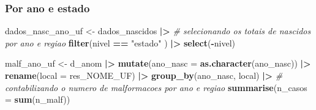 \documentclass[
]{article}
\newenvironment{Shaded}{\begin{snugshade}}{\end{snugshade}}
\newcommand{\AttributeTok}[1]{\textcolor[rgb]{0.13,0.29,0.53}{#1}}
\newcommand{\CommentTok}[1]{\textcolor[rgb]{0.56,0.35,0.01}{\textit{#1}}}
\newcommand{\FunctionTok}[1]{\textcolor[rgb]{0.13,0.29,0.53}{\textbf{#1}}}
\newcommand{\NormalTok}[1]{#1}
\newcommand{\OtherTok}[1]{\textcolor[rgb]{0.56,0.35,0.01}{#1}}
\newcommand{\SpecialCharTok}[1]{\textcolor[rgb]{0.81,0.36,0.00}{\textbf{#1}}}
\newcommand{\StringTok}[1]{\textcolor[rgb]{0.31,0.60,0.02}{#1}}
\begin{document}
\hypertarget{por-ano-e-estado}{%
\subsubsection{Por ano e estado}\label{por-ano-e-estado}}

\begin{Shaded}
\begin{Highlighting}[]
\NormalTok{dados\_nasc\_ano\_uf }\OtherTok{\textless{}{-}}\NormalTok{ dados\_nascidos }\SpecialCharTok{|\textgreater{}} 
  \CommentTok{\# selecionando os totais de nascidos por ano e regiao}
  \FunctionTok{filter}\NormalTok{(nivel }\SpecialCharTok{==} \StringTok{"estado"}\NormalTok{ ) }\SpecialCharTok{|\textgreater{}} 
  \FunctionTok{select}\NormalTok{(}\SpecialCharTok{{-}}\NormalTok{nivel)}

\NormalTok{malf\_ano\_uf }\OtherTok{\textless{}{-}}\NormalTok{ d\_anom }\SpecialCharTok{|\textgreater{}} 
  \FunctionTok{mutate}\NormalTok{(}\AttributeTok{ano\_nasc =} \FunctionTok{as.character}\NormalTok{(ano\_nasc)) }\SpecialCharTok{|\textgreater{}} 
  \FunctionTok{rename}\NormalTok{(}\AttributeTok{local =}\NormalTok{ res\_NOME\_UF) }\SpecialCharTok{|\textgreater{}} 
  \FunctionTok{group\_by}\NormalTok{(ano\_nasc, local) }\SpecialCharTok{|\textgreater{}} 
  \CommentTok{\# contabilizando o numero de malformacoes por ano e regiao}
  \FunctionTok{summarise}\NormalTok{(}\AttributeTok{n\_casos =} \FunctionTok{sum}\NormalTok{(n\_malf))}


\end{Highlighting}
\end{Shaded}
\end{document}
